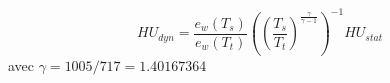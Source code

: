 \[
HU_{dyn} = 
\frac{e_w(T_s)}{e_w(T_t)}
\left(\left(\frac{T_s}{T_t}\right)^{\frac{\gamma}{\gamma-1}}\right)^{-1}
HU_{stat}
\]
avec $\gamma =  1005/717 = 1.40167364$
